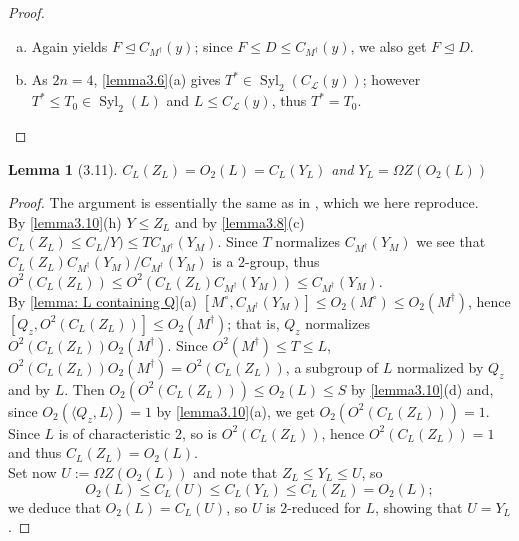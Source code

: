 \documentclass{amsart}
\numberwithin{equation}{section}
\newtheorem{lemma}[equation]{Lemma}
\theoremstyle{definition}
\theoremstyle{subresult}
\theoremstyle{caseresult}
\renewcommand{\L}{\mathcal{L}}
\newcommand{\Syl}{\operatorname{Syl}}
\newcommand{\Sp}{\operatorname{Sp}}
\renewcommand{\O}{\operatorname{O}}
\newcommand{\norm}{\trianglelefteq}
\newcommand{\<}{\langle}
\renewcommand{\>}{\rangle}
\begin{document}
\begin{proof}
\begin{enumerate}[(a)]
		\[
		D=FT(D \cap C_{M^\dagger}(Y_M)) = FTC_D(Y_M).
		\]
		Recalling that $T=C_S(Y)$ we get $D = FTC_D(Y_M) \le FC_D(Y) \le D$, so all equalities are proven.\\
		Since \cite[Lemma 3.4(c)]{Meier-Stell-Stroth:2012} shows that $Y$ is a natural $\O_{2n-1}(2)$-module for $FT$ and $Y/\<y\>$ is a natural $\Sp_{2n}(2)$-module for $FT$, we conclude that the same holds for $D$.
		\item Again \cite[Lemma 3.4(k)]{Meier-Stell-Stroth:2012} yields $F \norm C_{M^\dagger}(y)$; since $F \le D \le C_{M^\dagger}(y)$, we also get $F \norm D$.
		\item As $2n=4$, \ref{lemma3.6}(a) gives $T^* \in \Syl_2(C_\L(y))$; however $T^* \le T_0 \in \Syl_2(L)$ and $L \le C_\L(y)$, thus $T^* = T_0$.
	\end{enumerate}
\end{proof}

\begin{lemma}[3.11]\label{lemma3.11}
	$C_L(Z_L) = O_2(L) = C_L(Y_L)$ and $Y_L = \Omega Z(O_2(L))$
\end{lemma}
\begin{proof}
	The argument is essentially the same as in \cite[Lemma 3.11]{Meier-Stell-Stroth:2012}, which we here reproduce.\\
	By \ref{lemma3.10}(h) $Y \le Z_L$ and by \ref{lemma3.8}(c) $C_L(Z_L) \le C_L/Y) \le T C_{M^\dagger}(Y_M)$. Since $T$ normalizes $C_{M^\dagger}(Y_M)$ we see that $C_L(Z_L)C_{M^\dagger}(Y_M) / C_{M^\dagger}(Y_M)$ is a $2$-group, thus $O^2(C_L(Z_L)) \le O^2(C_L(Z_L)C_{M^\dagger}(Y_M)) \le C_{M^\dagger}(Y_M)$.\\
	By \ref{lemma: L containing Q}(a) $[M^\circ, C_{M^\dagger}(Y_M)] \le O_2(M^\circ) \le O_2(M^\dagger)$, hence $[Q_z, O^2(C_L(Z_L))] \le O_2(M^\dagger)$; that is, $Q_z$ normalizes $O^2(C_L(Z_L))O_2(M^\dagger)$. Since $O^2(M^\dagger) \le T \le L$, $O^2(C_L(Z_L)) O_2(M^\dagger) = O^2(C_L(Z_L))$, a subgroup of $L$ normalized by $Q_z$ and by $L$. Then $O_2(O^2(C_L(Z_L))) \le O_2(L) \le S$ by \ref{lemma3.10}(d) and, since $O_2(\<Q_z,L\>)=1$ by \ref{lemma3.10}(a), we get $O_2(O^2(C_L(Z_L)))=1$. Since $L$ is of characteristic $2$, so is $O^2(C_L(Z_L))$, hence $O^2(C_L(Z_L))=1$ and thus $C_L(Z_L) = O_2(L)$.\\
	Set now $U:=\Omega Z(O_2(L))$ and note that $Z_L \le Y_L \le U$, so
	\[
	O_2(L) \le C_L(U) \le C_L(Y_L) \le C_L(Z_L) = O_2(L);
	\]
	we deduce that $O_2(L) = C_L(U)$, so $U$ is $2$-reduced for $L$, showing that $U = Y_L$.
\end{proof}
\end{document}
